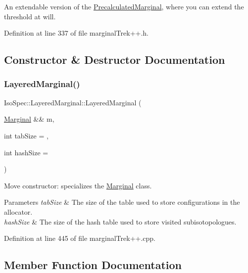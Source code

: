 An extendable version of the \mbox{\hyperlink{class_iso_spec_1_1_precalculated_marginal}{Precalculated\+Marginal}}, where you can extend the threshold at will. 

Definition at line 337 of file marginal\+Trek++.\+h.



\subsection{Constructor \& Destructor Documentation}
\mbox{\label{class_iso_spec_1_1_layered_marginal_af062d180664c9c856b4cc72e3457ca9d}} 
\subsubsection{\texorpdfstring{Layered\+Marginal()}{LayeredMarginal()}}
{\footnotesize\ttfamily Iso\+Spec\+::\+Layered\+Marginal\+::\+Layered\+Marginal (\begin{DoxyParamCaption}\item[{\mbox{\hyperlink{class_iso_spec_1_1_marginal}{Marginal}} \&\&}]{m,  }\item[{int}]{tab\+Size = {},  }\item[{int}]{hash\+Size = {} }\end{DoxyParamCaption})}



Move constructor\+: specializes the \mbox{\hyperlink{class_iso_spec_1_1_marginal}{Marginal}} class. 


\begin{DoxyParams}{Parameters}
{\em tab\+Size} & The size of the table used to store configurations in the allocator. \\
\hline
{\em hash\+Size} & The size of the hash table used to store visited subisotopologues. \\
\hline
\end{DoxyParams}


Definition at line 445 of file marginal\+Trek++.\+cpp.



\subsection{Member Function Documentation}
\mbox{\label{class_iso_spec_1_1_layered_marginal_ab8b66ed79bad27183f98a9ae34c3b944}} 
